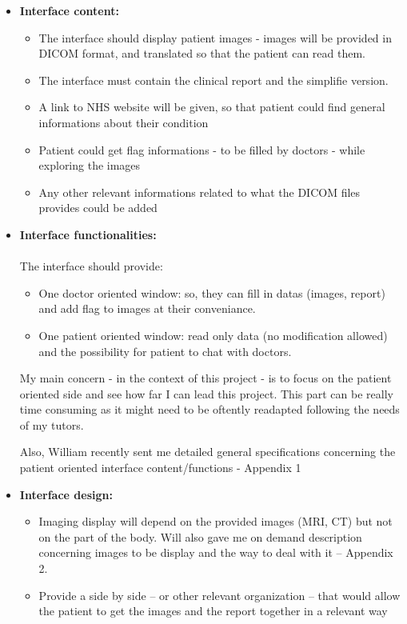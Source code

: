 \documentclass[12pt,twoside]{article}
\begin{document}
\begin{itemize}
	
\item \textbf{Interface content:}
\begin{itemize}
\item The interface should display patient images - images will be provided in DICOM format, and translated so that the patient can read them.
\item The interface must contain the clinical report and the simplifie version.
\item A link to NHS website will be given, so that patient could find general informations about their condition
\item Patient could get flag informations - to be filled by doctors - while exploring the images
\item Any other relevant informations related to what the DICOM files provides could be added 
\end{itemize}

\item \textbf{Interface functionalities:} \\ \\
The interface should provide:
\begin{itemize}
\item One doctor oriented window: so, they can fill in datas (images, report) and add flag to images at their conveniance.
\item One patient oriented window: read only data (no modification allowed) and the possibility for patient to chat with doctors.

\end{itemize}

My main concern - in the context of this project - is to focus on the patient oriented side and see how far I can lead this project. This part can be really time consuming as it might need to be oftently readapted following the needs of my tutors.

Also, William recently sent me detailed general specifications concerning the patient oriented interface content/functions - Appendix 1


\item \textbf{Interface design:}
\begin{itemize}
\item Imaging display will depend on the provided images (MRI, CT) but not on the part of the body. Will also gave me on demand description concerning images to be display and the way to deal with it – Appendix 2.
\item Provide a side by side – or other relevant organization – that would allow the patient to get the images and the report together in a relevant way


\end{itemize}
\end{itemize}
\end{document}
